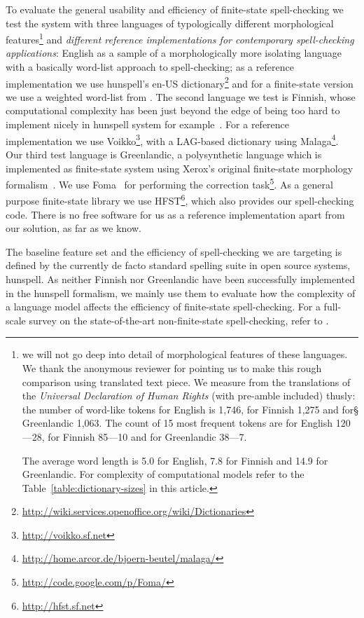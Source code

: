 \documentclass[free]{flammie}
\begin{document}
To evaluate the general usability and efficiency of finite-state spell-checking
we test the system with three languages of typologically different
morphological features\footnote{we will not go deep into detail of morphological
features of these languages. We thank the anonymous reviewer for pointing us
to make this rough comparison using translated text piece. We measure from the translations of the
\emph{Universal Declaration of Human Rights} (with pre-amble included) thusly:
the number of word-like tokens for English is 1,746, for Finnish 1,275 and for§
Greenlandic 1,063. The count of 15 most frequent tokens are for English
120---28,
for Finnish 85---10 and for Greenlandic 38---7. 


The average word length is 5.0 for English, 7.8 for Finnish and 14.9 for
Greenlandic. For complexity of computational models refer to the 
Table~\ref{table:dictionary-sizes} in this article.

} and \emph{different reference implementations for
contemporary spell-checking applications}: English as a sample of a
morphologically more isolating language with a basically word-list approach to
spell-checking; as a reference implementation we use hunspell's en-US
dictionary\footnote{\url{http://wiki.services.openoffice.org/wiki/Dictionaries}}
and for a finite-state version we use a weighted word-list from
\cite{norvig/2010}. The second language we test is Finnish, whose
computational complexity has been just beyond the edge of being too hard to
implement nicely in hunspell system for example~\cite{pitkanen/2006}. For a
reference implementation we use Voikko\footnote{\url{http://voikko.sf.net}},
with a LAG-based dictionary using
Malaga\footnote{\url{http://home.arcor.de/bjoern-beutel/malaga/}}. Our third
test language is Greenlandic, a polysynthetic language which is implemented as
finite-state system using Xerox's original finite-state morphology
formalism~\cite{beesley/2003}. We use Foma~\cite{foma} for performing the
correction task\footnote{\url{http://code.google.com/p/Foma/}}.  As a general
purpose finite-state library we use HFST\footnote{\url{http://hfst.sf.net}},
which also provides our spell-checking code. There is no free software for us
as a reference implementation apart from our solution, as far as we know.

The baseline feature set and the efficiency of spell-checking we are targeting
is defined by the currently de facto standard spelling suite in open source
systems, hunspell. As neither Finnish nor Greenlandic have been successfully
implemented in the hunspell formalism, we mainly use them to evaluate how
the complexity of a language model affects the efficiency of finite-state
spell-checking. For a full-scale survey on the state-of-the-art
non-finite-state spell-checking, refer to \cite{mitton/2009}.
\end{document}
